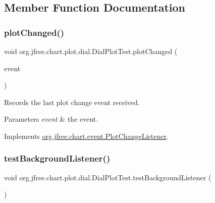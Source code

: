 \subsection{Member Function Documentation}
\mbox{\label{classorg_1_1jfree_1_1chart_1_1plot_1_1dial_1_1_dial_plot_test_ab4ae95b9ccee351cf787f78d8727753b}} 
\subsubsection{\texorpdfstring{plot\+Changed()}{plotChanged()}}
{\footnotesize\ttfamily void org.\+jfree.\+chart.\+plot.\+dial.\+Dial\+Plot\+Test.\+plot\+Changed (\begin{DoxyParamCaption}\item[{\mbox{\hyperlink{classorg_1_1jfree_1_1chart_1_1event_1_1_plot_change_event}{Plot\+Change\+Event}}}]{event }\end{DoxyParamCaption})}

Records the last plot change event received.


\begin{DoxyParams}{Parameters}
{\em event} & the event. \\
\hline
\end{DoxyParams}


Implements \mbox{\hyperlink{interfaceorg_1_1jfree_1_1chart_1_1event_1_1_plot_change_listener_aff1bdd2cc91287021b58a2ae67aa159d}{org.\+jfree.\+chart.\+event.\+Plot\+Change\+Listener}}.

\mbox{\label{classorg_1_1jfree_1_1chart_1_1plot_1_1dial_1_1_dial_plot_test_ab4ca91ada593bf4e9f512a7684f3fb2d}} 
\subsubsection{\texorpdfstring{test\+Background\+Listener()}{testBackgroundListener()}}
{\footnotesize\ttfamily void org.\+jfree.\+chart.\+plot.\+dial.\+Dial\+Plot\+Test.\+test\+Background\+Listener (\begin{DoxyParamCaption}{ }\end{DoxyParamCaption})}

